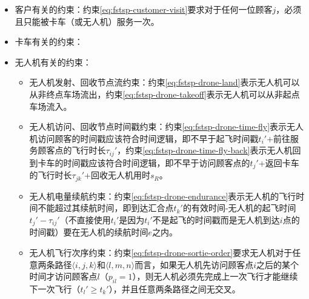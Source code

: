 \begin{itemize}
    \item \colorbox{shallow-green}{客户有关的约束：}约束\ref{eq:fstsp-customer-visit}要求对于任何一位顾客$j$，必须且只能被卡车（或无人机）服务一次。
    \item \colorbox{shallow-purple}{卡车有关的约束：}
    \item \colorbox{shallow-red}{无人机有关的约束：}
    \begin{itemize}
        \item 无人机发射、回收节点流约束：约束\ref{eq:fstsp-drone-land}表示无人机可以从非终点车场流出，约束\ref{eq:fstsp-drone-takeoff}表示无人机可以从非起点车场流入。
        \item 无人机访问、回收节点时间戳约束：约束\ref{eq:fstsp-drone-time-fly}表示无人机访问顾客的时间戳应该符合时间逻辑，即不早于起飞时间戳$t_i'$+前往服务顾客点的飞行时长$\tau_{ij}'$，约束\ref{eq:fstsp-drone-time-fly-back}表示无人机回到卡车的时间戳应该符合时间逻辑，即不早于访问顾客点的$t_j'$+返回卡车的飞行时长$\tau_{jk}'$+回收无人机用时$s_R$。
        \item 无人机电量续航约束：约束\ref{eq:fstsp-drone-endurance}表示无人机的飞行时间不能超过其续航时间，即到达汇合点$t_k'$的有效时间-无人机的起飞时间$t_j'-\tau_{ij}'$（不直接使用$t_i'$是因为$t_i'$不是起飞的时间戳而是无人机到达$i$点的时间戳）要在无人机的续航时间$e$之内。
        \item 无人机飞行次序约束：约束\ref{eq:fstsp-drone-sortie-order}要求无人机对于任意两条路径$\langle i,j,k \rangle$和$\langle l,m,n \rangle$而言，如果无人机先访问顾客点$i$之后的某个时间才访问顾客点$l$（$p_{il}=1$），则无人机必须先完成上一次飞行才能继续下一次飞行（$t_l'\geq t_k'$），并且任意两条路径之间无交叉。

\end{itemize}
\end{itemize}

